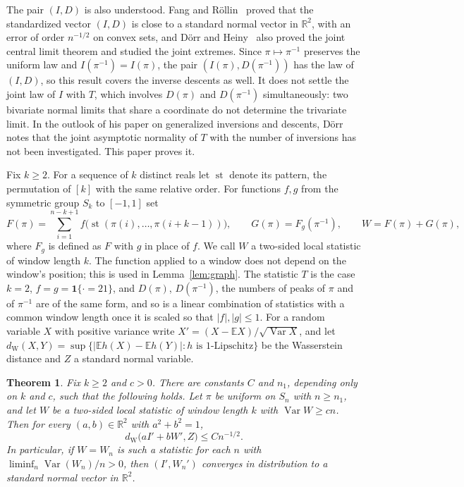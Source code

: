 \documentclass[11pt]{amsart}
\newtheorem{theorem}{Theorem}[section]
\theoremstyle{remark}
\newcommand{\E}{\mathbb{E}}
\newcommand{\Var}{\operatorname{Var}}
\newcommand{\dW}{d_{\mathrm W}}
\begin{document}
The pair $(I,D)$ is also understood. Fang and Röllin~\cite[Corollary~3.8]{FangRollin} proved that the standardized
vector $(I,D)$ is close to a standard normal vector in $\mathbb R^2$, with an error of order $n^{-1/2}$ on convex sets,
and Dörr and Heiny~\cite{DorrHeiny} also proved the joint central limit theorem and studied the joint extremes. Since
$\pi\mapsto\pi^{-1}$ preserves the uniform law and $I(\pi^{-1})=I(\pi)$, the pair $(I(\pi),D(\pi^{-1}))$ has the law of
$(I,D)$, so this result covers the inverse descents as well. It does not settle the joint law of $I$ with $T$, which
involves $D(\pi)$ and $D(\pi^{-1})$ simultaneously: two bivariate normal limits that share a coordinate do not determine
the trivariate limit. In the outlook of his paper on generalized inversions and descents, Dörr~\cite[Section~5]{Dorr}
notes that the joint asymptotic normality of $T$ with the number of inversions has not been investigated. This paper
proves it.

Fix $k\ge2$. For a sequence of $k$ distinct reals let $\operatorname{st}$ denote its pattern, the permutation of $[k]$
with the same relative order. For functions $f,g$ from the symmetric group $S_k$ to $[-1,1]$ set
\begin{equation}\label{eq:W}
F(\pi)=\sum_{i=1}^{n-k+1}f\bigl(\operatorname{st}(\pi(i),\dots,\pi(i+k-1))\bigr),\qquad
G(\pi)=F_g(\pi^{-1}),\qquad W=F(\pi)+G(\pi),
\end{equation}
where $F_g$ is defined as $F$ with $g$ in place of $f$. We call $W$ a two-sided local statistic of window length $k$.
The function applied to a window does not depend on the window's position; this is used in Lemma~\ref{lem:graph}.
The statistic $T$ is the case $k=2$, $f=g=\mathbf 1\{\cdot=21\}$, and $D(\pi)$, $D(\pi^{-1})$, the numbers of peaks
of $\pi$ and of $\pi^{-1}$ are of the same form, and so is a linear combination of statistics with a common window
length once it is scaled so that $|f|,|g|\le1$. For a random variable $X$ with
positive variance write $X'=(X-\E X)/\sqrt{\Var X}$, and let $\dW(X,Y)=\sup\{|\E h(X)-\E h(Y)|:h\text{ is 1-Lipschitz}\}$ be the Wasserstein distance and $Z$ a standard normal
variable.

\begin{theorem}\label{thm:main}
Fix $k\ge2$ and $c>0$. There are constants $C$ and $n_1$, depending only on $k$ and $c$, such that the following holds.
Let $\pi$ be uniform on $S_n$ with $n\ge n_1$, and let $W$ be a two-sided local statistic of window length $k$ with
$\Var W\ge cn$. Then for every $(a,b)\in\mathbb R^2$ with $a^2+b^2=1$,
\[
\dW\bigl(aI'+bW',Z\bigr)\le Cn^{-1/2}.
\]
In particular, if $W=W_n$ is such a statistic for each $n$ with $\liminf_n\Var(W_n)/n>0$, then
$(I',W_n')$ converges in distribution to a standard normal vector in $\mathbb R^2$.
\end{theorem}
\end{document}
